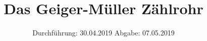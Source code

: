 

\subject{V703}
\title{Das Geiger-Müller Zählrohr}
\date{
  Durchführung: 30.04.2019
  \hspace{3em}
  Abgabe: 07.05.2019
}


\maketitle
\thispagestyle{empty}
\tableofcontents
\newpage

%


%




\printbibliography

